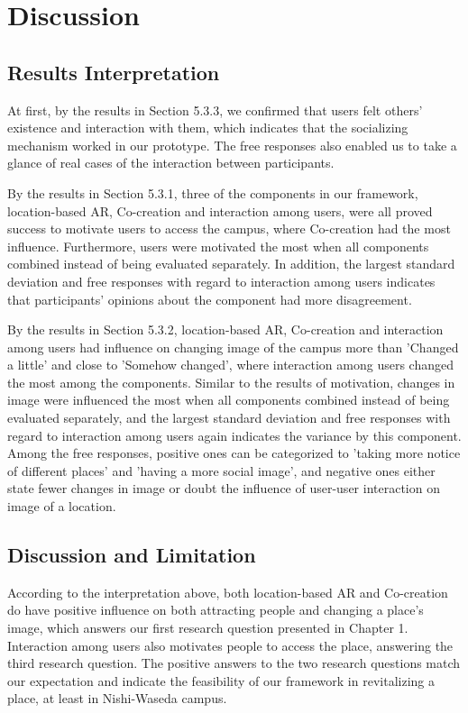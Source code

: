\chapter{Discussion}\label{ch:6}

\section{Results Interpretation}

At first, by the results in Section 5.3.3, we confirmed that users felt others' existence and interaction with them, which indicates that the socializing mechanism worked in our prototype.
The free responses also enabled us to take a glance of real cases of the interaction between participants.

By the results in Section 5.3.1, three of the components in our framework, location-based AR, Co-creation and interaction among users, were all proved success to motivate users to access the campus, where Co-creation had the most influence.
Furthermore, users were motivated the most when all components combined instead of being evaluated separately.
In addition, the largest standard deviation and free responses with regard to interaction among users indicates that participants' opinions about the component had more disagreement.

By the results in Section 5.3.2, location-based AR, Co-creation and interaction among users had influence on changing image of the campus more than 'Changed a little' and close to 'Somehow changed',
where interaction among users changed the most among the components.
Similar to the results of motivation, changes in image were influenced the most when all components combined instead of being evaluated separately,
and the largest standard deviation and free responses with regard to interaction among users again indicates the variance by this component.
Among the free responses, positive ones can be categorized to 'taking more notice of different places' and 'having a more social image',
and negative ones either state fewer changes in image or doubt the influence of user-user interaction on image of a location.

\section{Discussion and Limitation}

According to the interpretation above, both location-based AR and Co-creation do have positive influence on both attracting people and changing a place's image, which answers our first research question presented in Chapter 1.
Interaction among users also motivates people to access the place, answering the third research question.
The positive answers to the two research questions match our expectation and indicate the feasibility of our framework in revitalizing a place, at least in Nishi-Waseda campus.

